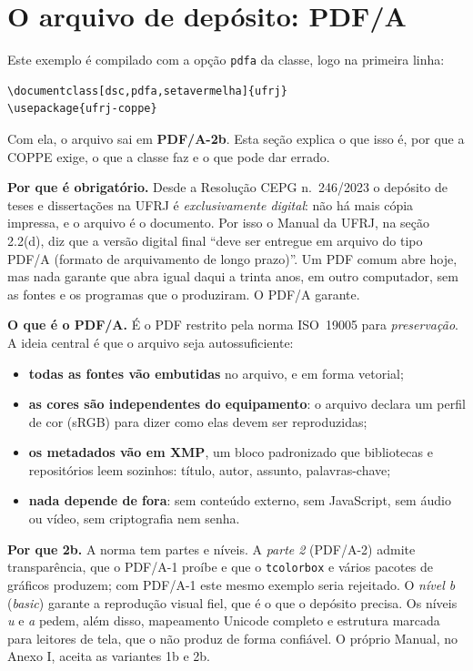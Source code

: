 \documentclass[dsc,pdfa,setavermelha]{ufrj}
\theoremstyle{plain}
\theoremstyle{definition}
\theoremstyle{remark}
\begin{document}
\section{O arquivo de depósito: PDF/A}
\label{sec:pdfa}

Este exemplo é compilado com a opção \verb|pdfa| da classe, logo na primeira linha:
\begin{verbatim}
\documentclass[dsc,pdfa,setavermelha]{ufrj}
\usepackage{ufrj-coppe}
\end{verbatim}
Com ela, o arquivo sai em \textbf{PDF/A-2b}. Esta seção explica o que isso é, por que a COPPE exige, o que a classe faz e o que pode dar errado.

\textbf{Por que é obrigatório.} Desde a Resolução CEPG n.~246/2023 o depósito de teses e dissertações na UFRJ é \emph{exclusivamente digital}: não há mais cópia impressa, e o arquivo é o documento. Por isso o Manual da UFRJ, na seção 2.2(d), diz que a versão digital final ``deve ser entregue em arquivo do tipo PDF/A (formato de arquivamento de longo prazo)''. Um PDF comum abre hoje, mas nada garante que abra igual daqui a trinta anos, em outro computador, sem as fontes e os programas que o produziram. O PDF/A garante.

\textbf{O que é o PDF/A.} É o PDF restrito pela norma ISO~19005 para \emph{preservação}. A ideia central é que o arquivo seja autossuficiente:
\begin{itemize}
  \item \textbf{todas as fontes vão embutidas} no arquivo, e em forma vetorial;
  \item \textbf{as cores são independentes do equipamento}: o arquivo declara um perfil de cor (sRGB) para dizer como elas devem ser reproduzidas;
  \item \textbf{os metadados vão em XMP}, um bloco padronizado que bibliotecas e repositórios leem sozinhos: título, autor, assunto, palavras-chave;
  \item \textbf{nada depende de fora}: sem conteúdo externo, sem JavaScript, sem áudio ou vídeo, sem criptografia nem senha.
\end{itemize}

\textbf{Por que 2b.} A norma tem partes e níveis. A \emph{parte 2} (PDF/A-2) admite transparência, que o PDF/A-1 proíbe e que o \verb|tcolorbox| e vários pacotes de gráficos produzem; com PDF/A-1 este mesmo exemplo seria rejeitado. O \emph{nível b} (\emph{basic}) garante a reprodução visual fiel, que é o que o depósito precisa. Os níveis \emph{u} e \emph{a} pedem, além disso, mapeamento Unicode completo e estrutura marcada para leitores de tela, que o  não produz de forma confiável. O próprio Manual, no Anexo I, aceita as variantes 1b e 2b.
\end{document}
